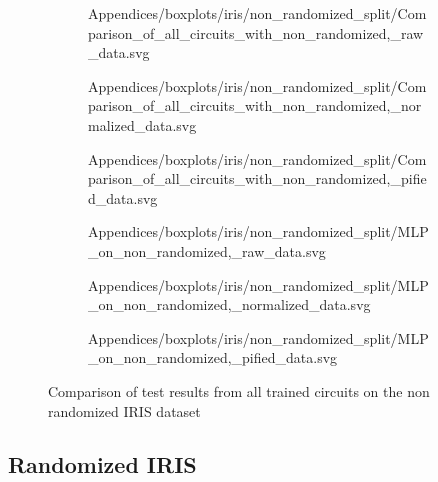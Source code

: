 \begin{figure}[!h]
    \begin{subfigure}{.5\textwidth}
        \centering
        
        {Appendices/boxplots/iris/non_randomized_split/Comparison_of_all_circuits_with_non_randomized,_raw_data.svg}
    \end{subfigure}
    \begin{subfigure}{.5\textwidth}
        \centering
        
        {Appendices/boxplots/iris/non_randomized_split/Comparison_of_all_circuits_with_non_randomized,_normalized_data.svg}
    \end{subfigure}
    \begin{subfigure}{.5\textwidth}
        \centering
        
        {Appendices/boxplots/iris/non_randomized_split/Comparison_of_all_circuits_with_non_randomized,_pified_data.svg}
    \end{subfigure}
    \begin{subfigure}{.5\textwidth}
        \centering
        
        {Appendices/boxplots/iris/non_randomized_split/MLP_on_non_randomized,_raw_data.svg}
    \end{subfigure}
    \begin{subfigure}{.5\textwidth}
        \centering
        
        {Appendices/boxplots/iris/non_randomized_split/MLP_on_non_randomized,_normalized_data.svg}
    \end{subfigure}
    \begin{subfigure}{.5\textwidth}
        \centering
        
        {Appendices/boxplots/iris/non_randomized_split/MLP_on_non_randomized,_pified_data.svg}
    \end{subfigure}
    \caption{Comparison of test results from all trained circuits on the non randomized IRIS dataset}
    \label{fig:circuits_results_non_r_iris}
\end{figure}
\clearpage

\subsection{Randomized IRIS}
\label{chapter:iris_randomized}

